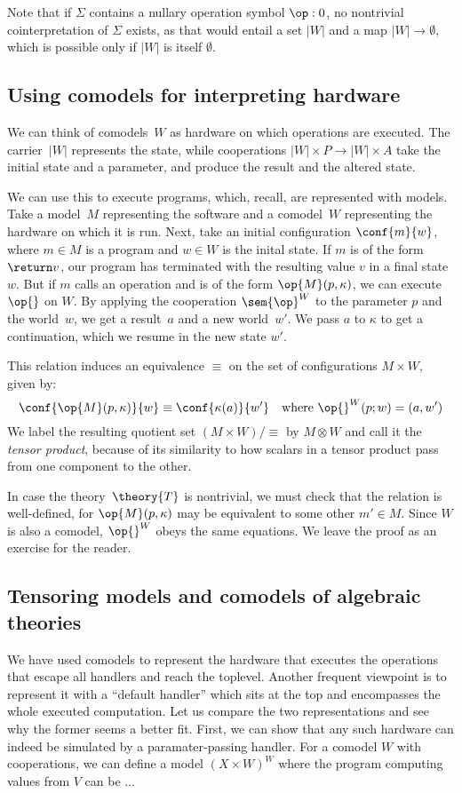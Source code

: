 \begin{example}
Note that if $\Sigma$ contains a nullary operation symbol $\op : 0$, no nontrivial cointerpretation of $\Sigma$ exists, as that would entail a set $|W|$ and a map $|W| \to \emptyset$, which is possible only if $|W|$ is itself $\emptyset$.
\end{example}

\subsection{Using comodels for interpreting hardware}

We can think of comodels~$W$ as hardware on which operations are executed. The carrier~$|W|$ represents the state, while cooperations $|W| \times P \to |W| \times A$ take the initial state and a parameter, and produce the result and the altered state.

We can use this to execute programs, which, recall, are represented with models. Take a model~$M$ representing the software and a comodel~$W$ representing the hardware  on which it is run. Next, take an initial configuration $\conf{m}{w}$, where $m \in M$ is a program and $w \in W$ is the inital state. If $m$ is of the form $\return v$, our program has terminated with the resulting value $v$ in a final state~$w$. But if $m$ calls an operation and is of the form $\op{M}(p, \kappa)$, we can execute $\op{}$ on $W$. By applying the cooperation $\sem{\op}^W$ to the parameter $p$ and the world~$w$, we get a result~$a$ and a new world~$w'$. We pass $a$ to $\kappa$ to get a continuation, which we resume in the new state $w'$.

This relation induces an equivalence $\equiv$ on the set of configurations $M \times W$, given by:
\[
  \conf{\op{M}(p, \kappa)}{w} \equiv \conf{\kappa(a)}{w'} \quad\text{where $\op{}^W(p; w) = (a, w')$}
\]
We label the resulting quotient set $(M \times W) / \equiv$ by $M \otimes W$ and call it the \emph{tensor product}, because of its similarity to how scalars in a tensor product pass from one component to the other.

In case the theory~$\theory{T}$ is nontrivial, we must check that the relation is well-defined, for $\op{M}(p, \kappa)$ may be equivalent to some other $m' \in M$. Since $W$ is also a comodel, $\op{}^W$ obeys the same equations. We leave the proof as an exercise for the reader.

\subsection{Tensoring models and comodels of algebraic theories}
\label{sec:tensoring-models}

We have used comodels to represent the hardware that executes the operations that escape all handlers and reach the toplevel. Another frequent viewpoint is to represent it with a ``default handler'' which sits at the top and encompasses the whole executed computation. Let us compare the two representations and see why the former seems a better fit. First, we can show that any such hardware can indeed be simulated by a paramater-passing handler. For a comodel $W$ with cooperations, we can define a model $(X \times W)^W$ where the program computing values from $V$ can be ...
